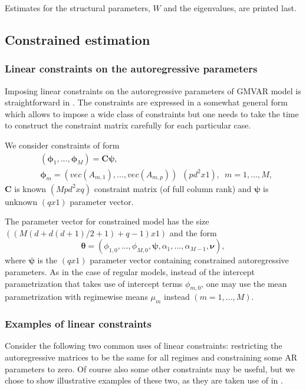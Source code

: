 \documentclass[nojss]{jss} %
\begin{document}
Estimates for the structural parameters, $W$ and the eigenvalues, are printed last.

\subsection{Constrained estimation}\label{sec:examp_const}

\subsubsection{Linear constraints on the autoregressive parameters}
Imposing linear constraints on the autoregressive parameters of GMVAR model is straightforward in . The constraints are expressed in a somewhat general form which allows to impose a wide class of constraints but one needs to take the time to construct the constraint matrix carefully for each particular case.

We consider constraints of form
\begin{align}
& (\boldsymbol{\phi}_1,...,\boldsymbol{\phi}_M) = \boldsymbol{C}\boldsymbol{\psi},\\
& \boldsymbol{\phi}_m=(vec(A_{m,1}),...,vec(A_{m,p}))\enspace (pd^2x1), \enspace m=1,...,M,
\end{align}
$\boldsymbol{C}$ is known $(Mpd^2xq)$ constraint matrix (of full column rank) and $\boldsymbol{\psi}$ is unknown $(qx1)$ parameter vector.

The parameter vector for constrained model has the size $((M(d+d(d+1)/2+1)+q-1)x1)$ and the form
\begin{equation}
\boldsymbol{\theta} = (\phi_{1,0},...,\phi_{M,0},\boldsymbol{\psi},\alpha_1,...,\alpha_{M-1},\boldsymbol{\nu}),
\end{equation}
where $\boldsymbol{\psi}$ is the $(qx1)$ parameter vector containing constrained autoregressive parameters. As in the case of regular models, instead of the intercept parametrization that takes use of intercept terms $\phi_{m,0}$, one may use the mean parametrization with regimewise means $\mu_m$ instead $(m=1,...,M)$.

\subsubsection{Examples of linear constraints}
Consider the following two common uses of linear constraints: restricting the autoregressive matrices to be the same for all regimes and constraining some AR parameters to zero. Of course also some other constraints may be useful, but we chose to show illustrative examples of these two, as they are taken use of in \cite{Kalliovirta+Meitz+Saikkonen:2016}.
\end{document}
